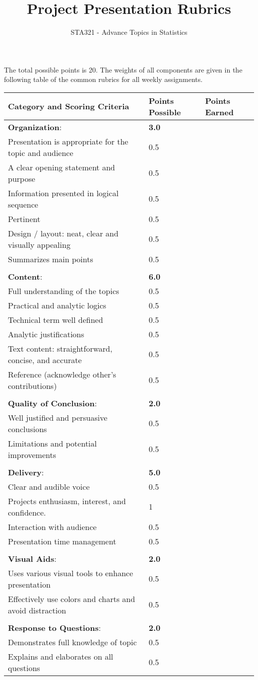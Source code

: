 \documentclass[
]{article}
\title{Project Presentation Rubrics}
\author{STA321 - Advance Topics in Statistics}
\date{}
\begin{document}
\maketitle

\hfill\break

The total possible points is 20. The weights of all components are given
in the following table of the common rubrics for all weekly assignments.

\hfill\break

\begin{longtable}[]{@{}lll@{}}
\toprule
Category and Scoring Criteria & Points Possible & Points
Earned\tabularnewline
\midrule
\endhead
\textbf{Organization}: & \textbf{3.0} &\tabularnewline
Presentation is appropriate for the topic and audience & 0.5
&\tabularnewline
A clear opening statement and purpose & 0.5 &\tabularnewline
Information presented in logical sequence & 0.5 &\tabularnewline
Pertinent & 0.5 &\tabularnewline
Design / layout: neat, clear and visually appealing & 0.5
&\tabularnewline
Summarizes main points & 0.5 &\tabularnewline
& &\tabularnewline
\textbf{Content}: & \textbf{6.0} &\tabularnewline
Full understanding of the topics & 0.5 &\tabularnewline
Practical and analytic logics & 0.5 &\tabularnewline
Technical term well defined & 0.5 &\tabularnewline
Analytic justifications & 0.5 &\tabularnewline
Text content: straightforward, concise, and accurate & 0.5
&\tabularnewline
Reference (acknowledge other's contributions) & 0.5 &\tabularnewline
& &\tabularnewline
\textbf{Quality of Conclusion}: & \textbf{2.0} &\tabularnewline
Well justified and persuasive conclusions & 0.5 &\tabularnewline
Limitations and potential improvements & 0.5 &\tabularnewline
& &\tabularnewline
\textbf{Delivery}: & \textbf{5.0} &\tabularnewline
Clear and audible voice & 0.5 &\tabularnewline
Projects enthusiasm, interest, and confidence. & 1 &\tabularnewline
Interaction with audience & 0.5 &\tabularnewline
Presentation time management & 0.5 &\tabularnewline
& &\tabularnewline
\textbf{Visual Aids}: & \textbf{2.0} &\tabularnewline
Uses various visual tools to enhance presentation & 0.5 &\tabularnewline
Effectively use colors and charts and avoid distraction & 0.5
&\tabularnewline
& &\tabularnewline
\textbf{Response to Questions}: & \textbf{2.0} &\tabularnewline
Demonstrates full knowledge of topic & 0.5 &\tabularnewline
Explains and elaborates on all questions & 0.5 &\tabularnewline
\bottomrule
\end{longtable}

\hfill\break

\hfill\break

\hfill\break
\end{document}
